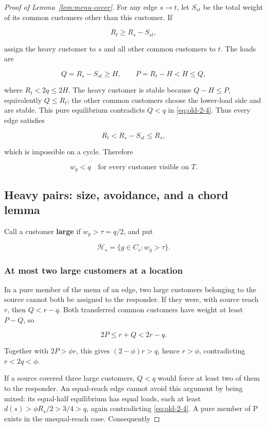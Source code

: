 \documentclass[11pt]{amsart}
\numberwithin{equation}{section}
\theoremstyle{definition}
\begin{document}
\begin{proof}[Proof of Lemma~\ref{lem:menu-cover}]
For any edge \(s\to t\), let \(S_{st}\) be the total weight of its common customers other than this customer. If

\[
R_t\ge R_s-S_{st},
\]

assign the heavy customer to \(s\) and all other common customers to \(t\). The loads are

\[
Q=R_s-S_{st}\ge H,\qquad P=R_t-H<H\le Q,
\]

where \(R_t<2q\le2H\). The heavy customer is stable because \(Q-H\le P\), equivalently \(Q\le R_t\); the other common customers choose the lower-load side and are stable. This pure equilibrium contradicts \(Q<q\) in \eqref{eq:old-2-4}. Thus every edge satisfies

\[
R_t<R_s-S_{st}\le R_s,
\]

which is impossible on a cycle. Therefore

\begin{equation}
w_g<q\quad\text{for every customer visible on }T. \label{eq:old-4-1}
\end{equation}


\subsection{Heavy pairs: size, avoidance, and a chord lemma}\label{heavy-pairs-size-avoidance-and-a-chord-lemma}

Call a customer \textbf{large} if \(w_g>\tau=q/2\), and put

\[
\mathcal H_s=\{g\in C_s:w_g>\tau\}.
\]


\subsubsection{At most two large customers at a location}\label{at-most-two-large-customers-at-a-location}

In a pure member of the menu of an edge, two large customers belonging to the source cannot both be assigned to the responder. If they were, with source reach \(r\), then \(Q<r-q\). Both transferred common customers have weight at least \(P-Q\), so

\[
2P\le r+Q<2r-q.
\]

Together with \(2P>\phi r\), this gives \((2-\phi)r>q\), hence \(r>\phi\), contradicting \(r<2q<\phi\).

If a source covered three large customers, \(Q<q\) would force at least two of them to the responder. An equal-reach edge cannot avoid this argument by being mixed: its equal-half equilibrium has equal loads, each at least \(d(s)>\phi R_s/2>3/4>q\), again contradicting \eqref{eq:old-2-4}. A pure member of P exists in the unequal-reach case. Consequently


\end{proof}
\end{document}
